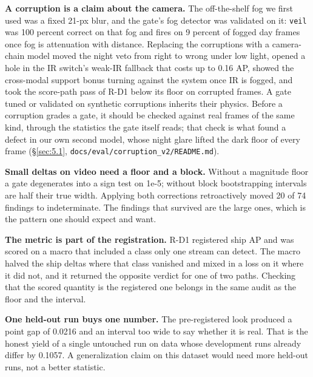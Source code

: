 \documentclass[10pt]{article}
\begin{document}
\textbf{A corruption is a claim about the camera.} The off-the-shelf fog we first used was a fixed 21-px blur, and the gate's fog detector was validated on it: \texttt{veil} was 100 percent correct on that fog and fires on 9 percent of fogged day frames once fog is attenuation with distance. Replacing the corruptions with a camera-chain model moved the night veto from right to wrong under low light, opened a hole in the IR switch's weak-IR fallback that costs up to 0.16 AP, showed the cross-modal support bonus turning against the system once IR is fogged, and took the score-path pass of R-D1 below its floor on corrupted frames. A gate tuned or validated on synthetic corruptions inherits their physics. Before a corruption grades a gate, it should be checked against real frames of the same kind, through the statistics the gate itself reads; that check is what found a defect in our own second model, whose night glare lifted the dark floor of every frame (\S\ref{sec:5.1}, \texttt{docs/\allowbreak{}eval/\allowbreak{}corruption\_\allowbreak{}v2/\allowbreak{}README.md}).

\textbf{Small deltas on video need a floor and a block.} Without a magnitude floor a gate degenerates into a sign test on 1e-5; without block bootstrapping intervals are half their true width. Applying both corrections retroactively moved 20 of 74 findings to indeterminate. The findings that survived are the large ones, which is the pattern one should expect and want.

\textbf{The metric is part of the registration.} R-D1 registered ship AP and was scored on a macro that included a class only one stream can detect. The macro halved the ship deltas where that class vanished and mixed in a loss on it where it did not, and it returned the opposite verdict for one of two paths. Checking that the scored quantity is the registered one belongs in the same audit as the floor and the interval.

\textbf{One held-out run buys one number.} The pre-registered look produced a point gap of 0.0216 and an interval too wide to say whether it is real. That is the honest yield of a single untouched run on data whose development runs already differ by 0.1057. A generalization claim on this dataset would need more held-out runs, not a better statistic.
\end{document}
